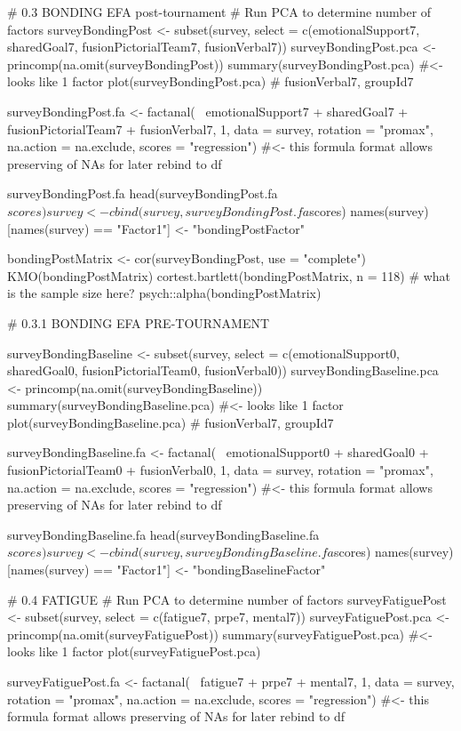 # 0.3 BONDING EFA post-tournament
# Run PCA to determine number of factors
surveyBondingPost <- subset(survey, select = c(emotionalSupport7, sharedGoal7, fusionPictorialTeam7, fusionVerbal7))
surveyBondingPost.pca <- princomp(na.omit(surveyBondingPost))
summary(surveyBondingPost.pca)  #<- looks like 1 factor
plot(surveyBondingPost.pca)
# fusionVerbal7, groupId7

surveyBondingPost.fa <- factanal(~ emotionalSupport7 + sharedGoal7 + fusionPictorialTeam7 + fusionVerbal7, 1,
                                    data = survey, rotation = "promax", na.action = na.exclude, scores = "regression")  #<- this formula format allows preserving of NAs for later rebind to df

surveyBondingPost.fa
head(surveyBondingPost.fa$scores)
survey <- cbind(survey, surveyBondingPost.fa$scores)
names(survey)[names(survey) == "Factor1"] <- "bondingPostFactor"

bondingPostMatrix <- cor(surveyBondingPost, use = "complete")
KMO(bondingPostMatrix)
cortest.bartlett(bondingPostMatrix, n = 118) # what is the sample size here?
psych::alpha(bondingPostMatrix)

# 0.3.1 BONDING EFA PRE-TOURNAMENT

surveyBondingBaseline <- subset(survey, select = c(emotionalSupport0, sharedGoal0, fusionPictorialTeam0, fusionVerbal0))
surveyBondingBaseline.pca <- princomp(na.omit(surveyBondingBaseline))
summary(surveyBondingBaseline.pca)  #<- looks like 1 factor
plot(surveyBondingBaseline.pca)
# fusionVerbal7, groupId7

surveyBondingBaseline.fa <- factanal(~ emotionalSupport0 + sharedGoal0 + fusionPictorialTeam0 + fusionVerbal0, 1,
                                 data = survey, rotation = "promax", na.action = na.exclude, scores = "regression")  #<- this formula format allows preserving of NAs for later rebind to df

surveyBondingBaseline.fa
head(surveyBondingBaseline.fa$scores)
survey <- cbind(survey, surveyBondingBaseline.fa$scores)
names(survey)[names(survey) == "Factor1"] <- "bondingBaselineFactor"



# 0.4 FATIGUE
# Run PCA to determine number of factors
surveyFatiguePost <- subset(survey, select = c(fatigue7, prpe7, mental7))
surveyFatiguePost.pca <- princomp(na.omit(surveyFatiguePost))
summary(surveyFatiguePost.pca)  #<- looks like 1 factor
plot(surveyFatiguePost.pca)


surveyFatiguePost.fa <- factanal(~ fatigue7 + prpe7 + mental7, 1,
                                 data = survey, rotation = "promax", na.action = na.exclude, scores = "regression")  #<- this formula format allows preserving of NAs for later rebind to df


